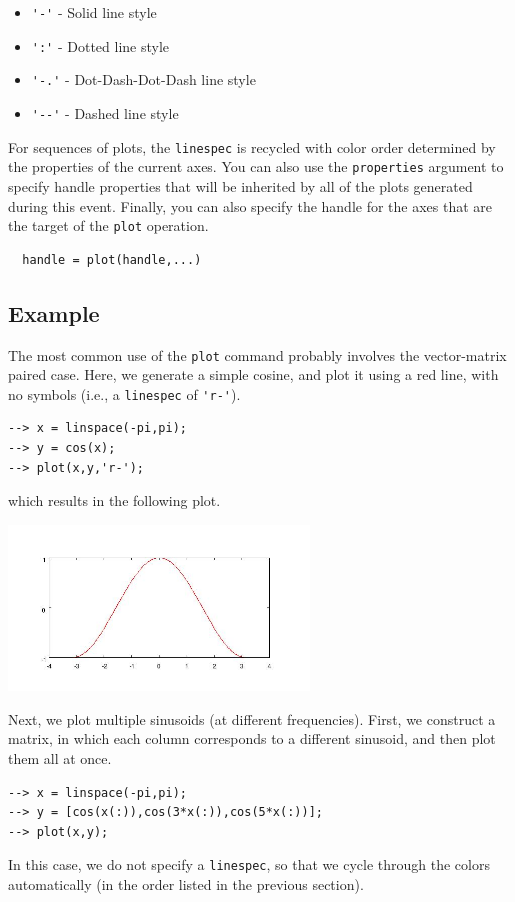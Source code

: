 \begin{itemize}
\item  \verb|'-'| - Solid line style

\item  \verb|':'| - Dotted line style

\item  \verb|'-.'| - Dot-Dash-Dot-Dash line style

\item  \verb|'--'| - Dashed line style

\end{itemize}
For sequences of plots, the \verb|linespec| is recycled with color order determined
by the properties of the current axes.  You can also use the \verb|properties|
argument to specify handle properties that will be inherited by all of the plots
generated during this event.  Finally, you can also specify the handle for the
axes that are the target of the \verb|plot| operation.
\begin{verbatim}
  handle = plot(handle,...)
\end{verbatim}
\subsection{Example}

The most common use of the \verb|plot| command probably involves the vector-matrix
paired case.  Here, we generate a simple cosine, and plot it using a red line, with
no symbols (i.e., a \verb|linespec| of \verb|'r-'|).
\begin{verbatim}
--> x = linspace(-pi,pi);
--> y = cos(x);
--> plot(x,y,'r-');
\end{verbatim}
which results in the following plot.


\centerline{\includegraphics[width=8cm]{plot1}}


Next, we plot multiple sinusoids (at different frequencies).  First, we construct
a matrix, in which each column corresponds to a different sinusoid, and then plot
them all at once.
\begin{verbatim}
--> x = linspace(-pi,pi);
--> y = [cos(x(:)),cos(3*x(:)),cos(5*x(:))];
--> plot(x,y);
\end{verbatim}
In this case, we do not specify a \verb|linespec|, so that we cycle through the
colors automatically (in the order listed in the previous section).


